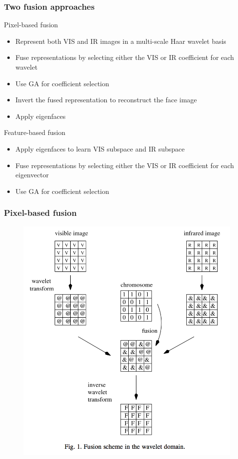 \documentclass{beamer}
\begin{document}
\begin{frame}
\frametitle{Two fusion approaches}
\begin{block}{Pixel-based fusion}
\begin{itemize}
\item Represent both VIS and IR images in a multi-scale Haar wavelet basis
\item Fuse representations by selecting either the VIS or IR coefficient for each wavelet
\item Use GA for coefficient selection
\item Invert the fused representation to reconstruct the face image
\item Apply eigenfaces 
\end{itemize}
\end{block}
\pause
\begin{block}{Feature-based fusion}
\begin{itemize}
\item Apply eigenfaces to learn VIS subspace and IR subspace
\item Fuse representations by selecting either the VIS or IR coefficient for each eigenvector
\item Use GA for coefficient selection
\end{itemize}
\end{block}
\end{frame}

\begin{frame}
\frametitle{Pixel-based fusion}
\begin{figure}
\includegraphics[height=0.8\textheight]{pixelfusion}
\end{figure}
\end{frame}
\end{document}
